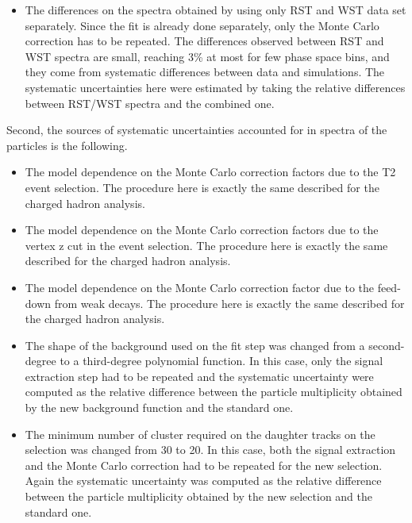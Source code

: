 \begin{itemize}
\item The differences on the spectra obtained by using only
  RST and WST data set separately. Since the \dedx fit
  is already done separately, only the Monte Carlo correction has to be
  repeated. The differences observed between RST and WST spectra are small,
  reaching 3\% at most for few phase space bins, and they come from
  systematic differences between data and simulations. The systematic
  uncertainties here were estimated by taking the relative differences
  between RST/WST spectra and the combined one.
  
\end{itemize}

Second, the sources of systematic uncertainties accounted for in
spectra of the \vzero particles is the following.
\begin{itemize}
  
\item The model dependence on the Monte Carlo correction factors due to
  the T2 event selection. The procedure here is exactly the same described
  for the charged hadron analysis.
  
\item The model dependence on the Monte Carlo correction factors due to
  the vertex z cut in the event selection.
  The procedure here is exactly the same described
  for the charged hadron analysis.
  
\item The model dependence on the Monte Carlo correction factor due to
  the feed-down from weak decays. The procedure here is exactly the same described
  for the charged hadron analysis.
  
\item The shape of the background used on the \minv fit step
  was changed from a second-degree to a third-degree polynomial
  function. In this case, only the signal extraction step had to be
  repeated and the systematic uncertainty were computed as the relative
  difference between the particle multiplicity obtained by the new
  background function and the standard one.

\item The minimum number of cluster required on the daughter tracks on the
  \vzero selection was changed from 30 to 20. In this case, both the signal
  extraction and the Monte Carlo correction had to be repeated for the new \vzero
  selection. Again the systematic uncertainty was computed as the relative
  difference between the particle multiplicity obtained by the new
  selection and the standard one.

\end{itemize}

